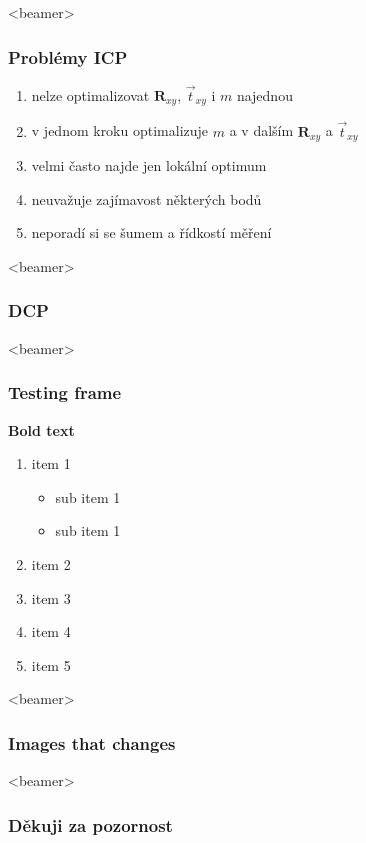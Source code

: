 \documentclass[t]{beamer}
\begin{document}
\begin{frame}<beamer>
  \frametitle{Problémy ICP}
  \begin{enumerate}
   \item nelze optimalizovat  $\textbf{R}_{xy}$, $\vec{t}_{xy}$ i $m$ najednou
   \item v jednom kroku optimalizuje $m$ a v dalším  $\textbf{R}_{xy}$ a $\vec{t}_{xy}$
   \item velmi často najde jen lokální optimum
   \item neuvažuje zajímavost některých bodů 
   \item neporadí si se šumem a řídkostí měření 
  \end{enumerate}  
\end{frame}



\begin{frame}<beamer>
  \frametitle{DCP}

\end{frame}















\begin{frame}<beamer>
  \frametitle{Testing frame}
	\textbf{Bold text}
  \begin{enumerate}
		 \item<3-> item 1 
		 \begin{itemize}
		 	\item<4-> sub item 1\onslide<10>{ - new note}
		 	\item<5-> sub \alert<9>{item 1}
		 \end{itemize}	
		 \item<6-> item 2
		 \item<7-9> item 3
		 \item<8-> item 4
		 \item<11-> item 5
  \end{enumerate}
\end{frame}

\begin{frame}<beamer>
  \frametitle{Images that changes}

\begin{figure}[htb]
	
		\begin{overprint}
		\centering
		\end{overprint}
\end{figure}		

\end{frame}




\begin{frame}<beamer>
  \frametitle{Děkuji za pozornost}
  
\end{frame}		
\end{document}
